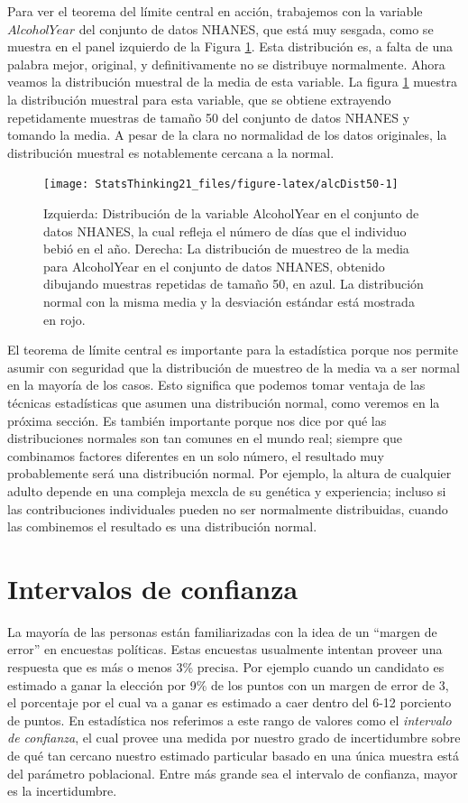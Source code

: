 \documentclass[
  12pt,
]{book}
\begin{document}
Para ver el teorema del límite central en acción, trabajemos con la variable \(AlcoholYear\) del conjunto de datos NHANES, que está muy sesgada, como se muestra en el panel izquierdo de la Figura \ref{fig:alcDist50}. Esta distribución es, a falta de una palabra mejor, original, y definitivamente no se distribuye normalmente. Ahora veamos la distribución muestral de la media de esta variable. La figura \ref{fig:alcDist50} muestra la distribución muestral para esta variable, que se obtiene extrayendo repetidamente muestras de tamaño 50 del conjunto de datos NHANES y tomando la media. A pesar de la clara no normalidad de los datos originales, la distribución muestral es notablemente cercana a la normal.

\begin{figure}
\texttt{[image: StatsThinking21\_files/figure-latex/alcDist50-1]} \caption{Izquierda: Distribución de la variable AlcoholYear en el conjunto de datos NHANES, la cual refleja el número de días que el individuo bebió en el año. Derecha: La distribución de muestreo de la media para AlcoholYear en el conjunto de datos NHANES, obtenido dibujando muestras repetidas de tamaño 50, en azul. La distribución normal con la misma media y la desviación estándar está mostrada en rojo.}\label{fig:alcDist50}
\end{figure}

El teorema de límite central es importante para la estadística porque nos permite asumir con seguridad que la distribución de muestreo de la media va a ser normal en la mayoría de los casos. Esto significa que podemos tomar ventaja de las técnicas estadísticas que asumen una distribución normal, como veremos en la próxima sección. Es también importante porque nos dice por qué las distribuciones normales son tan comunes en el mundo real; siempre que combinamos factores diferentes en un solo número, el resultado muy probablemente será una distribución normal. Por ejemplo, la altura de cualquier adulto depende en una compleja mexcla de su genética y experiencia; incluso si las contribuciones individuales pueden no ser normalmente distribuidas, cuando las combinemos el resultado es una distribución normal.

\hypertarget{confidence-intervals}{%
\section{Intervalos de confianza}\label{confidence-intervals}}

La mayoría de las personas están familiarizadas con la idea de un ``margen de error'' en encuestas políticas. Estas encuestas usualmente intentan proveer una respuesta que es más o menos 3\% precisa. Por ejemplo cuando un candidato es estimado a ganar la elección por 9\% de los puntos con un margen de error de 3, el porcentaje por el cual va a ganar es estimado a caer dentro del 6-12 porciento de puntos. En estadística nos referimos a este rango de valores como el \emph{intervalo de confianza}, el cual provee una medida por nuestro grado de incertidumbre sobre de qué tan cercano nuestro estimado particular basado en una única muestra está del parámetro poblacional. Entre más grande sea el intervalo de confianza, mayor es la incertidumbre.
\end{document}
